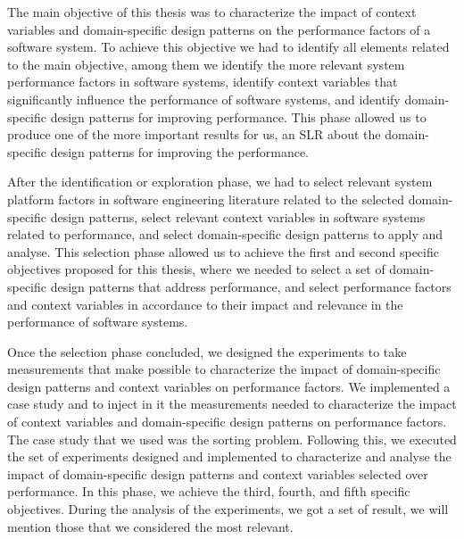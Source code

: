 The main objective of this thesis was to characterize the impact of context variables and domain-specific design patterns on the performance factors of a software system. To achieve this objective we had to identify all elements related to the main objective, among them we identify the more relevant system performance factors in software systems, identify context variables that significantly influence the performance of software systems, and identify domain-specific design patterns for improving performance. This phase allowed us to produce one of the more important results for us, an SLR about the domain-specific design patterns for improving the performance.

After the identification or exploration phase, we had to select relevant system platform factors in software engineering literature related to the selected domain-specific design patterns, select relevant context variables in software systems related to performance, and select domain-specific design patterns to apply and analyse. This selection phase allowed us to achieve the first and second specific objectives proposed for this thesis, where we needed to select a set of domain-specific design patterns that address performance, and select performance factors and context variables in accordance to their impact and relevance in the performance of software systems.

Once the selection phase concluded, we designed the experiments to take measurements that make possible to characterize the impact of domain-specific design patterns and context variables on performance factors. We implemented a case study and to inject in it the measurements needed to characterize the impact of context variables and domain-specific design patterns on performance factors. The case study that we used was the sorting problem. Following this, we executed the set of experiments designed and implemented to characterize and analyse the impact of domain-specific design patterns and context variables selected over performance. In this phase, we achieve the third, fourth, and fifth specific objectives. During the analysis of the experiments, we got a set of result, we will mention those that we considered the most relevant.

